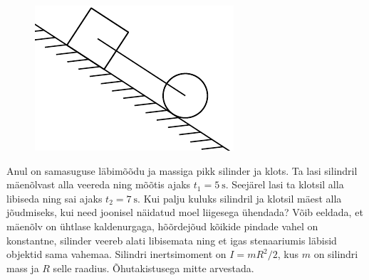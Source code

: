 
\begin{figure}
    \vspace{-25pt}
    \begin{center}
        \includegraphics[width=\linewidth]{2023-lahg-09-yl.pdf}
    \end{center}
\end{figure}
Anul on samasuguse läbimõõdu ja massiga pikk silinder ja klots. Ta lasi silindril mäenõlvast alla veereda ning mõõtis ajaks $t_1 = \SI{5}{\second}$. Seejärel lasi ta klotsil alla libiseda ning sai ajaks $t_2 = \SI{7}{\second}$. Kui palju kuluks silindril ja klotsil mäest alla jõudmiseks, kui need joonisel näidatud moel liigesega ühendada? Võib eeldada, et mäenõlv on ühtlase kaldenurgaga, hõõrdejõud kõikide pindade vahel on konstantne, silinder veereb alati libisemata ning et igas stenaariumis läbisid objektid sama vahemaa. Silindri inertsimoment on $I=mR^2/2$, kus $m$ on silindri mass ja $R$ selle raadius. Õhutakistusega mitte arvestada.









